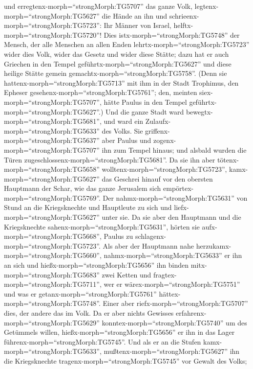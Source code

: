 und erregtenx-morph=``strongMorph:TG5707'' das ganze Volk,
legtenx-morph=``strongMorph:TG5627'' die Hände an ihn und
schrieenx-morph=``strongMorph:TG5723'':  Ihr Männer von
Israel, helftx-morph=``strongMorph:TG5720''! Dies
istx-morph=``strongMorph:TG5748'' der Mensch, der alle Menschen an allen
Enden lehrtx-morph=``strongMorph:TG5723'' wider dies Volk, wider das
Gesetz und wider diese Stätte; dazu hat er auch Griechen in den Tempel
geführtx-morph=``strongMorph:TG5627'' und diese heilige Stätte gemein
gemachtx-morph=``strongMorph:TG5758''.  (Denn sie
hattenx-morph=``strongMorph:TG5713'' mit ihm in der Stadt Trophimus, den
Epheser gesehenx-morph=``strongMorph:TG5761''; den, meinten
siex-morph=``strongMorph:TG5707'', hätte Paulus in den Tempel
geführtx-morph=``strongMorph:TG5627''.)  Und die ganze
Stadt ward bewegtx-morph=``strongMorph:TG5681'', und ward ein
Zulaufx-morph=``strongMorph:TG5633'' des Volks. Sie
griffenx-morph=``strongMorph:TG5637'' aber Paulus und
zogenx-morph=``strongMorph:TG5707'' ihn zum Tempel hinaus; und alsbald
wurden die Türen zugeschlossenx-morph=``strongMorph:TG5681''.
 Da sie ihn aber tötenx-morph=``strongMorph:TG5658''
wolltenx-morph=``strongMorph:TG5723'', kamx-morph=``strongMorph:TG5627''
das Geschrei hinauf vor den obersten Hauptmann der Schar, wie das ganze
Jerusalem sich empörtex-morph=``strongMorph:TG5769''.  Der
nahmx-morph=``strongMorph:TG5631'' von Stund an die Kriegsknechte und
Hauptleute zu sich und liefx-morph=``strongMorph:TG5627'' unter sie. Da
sie aber den Hauptmann und die Kriegsknechte
sahenx-morph=``strongMorph:TG5631'', hörten sie
aufx-morph=``strongMorph:TG5668'', Paulus zu
schlagenx-morph=``strongMorph:TG5723''.  Als aber der
Hauptmann nahe herzukamx-morph=``strongMorph:TG5660'',
nahmx-morph=``strongMorph:TG5633'' er ihn an sich und
hießx-morph=``strongMorph:TG5656'' ihn binden
mitx-morph=``strongMorph:TG5683'' zwei Ketten und
fragtex-morph=``strongMorph:TG5711'', wer er
wärex-morph=``strongMorph:TG5751'' und was er
getanx-morph=``strongMorph:TG5761'' hättex-morph=``strongMorph:TG5748''.
 Einer aber riefx-morph=``strongMorph:TG5707'' dies, der
andere das im Volk. Da er aber nichts Gewisses
erfahrenx-morph=``strongMorph:TG5629''
konntex-morph=``strongMorph:TG5740'' um des Getümmels willen,
hießx-morph=``strongMorph:TG5656'' er ihn in das Lager
führenx-morph=``strongMorph:TG5745''.  Und als er an die
Stufen kamx-morph=``strongMorph:TG5633'',
mußtenx-morph=``strongMorph:TG5627'' ihn die Kriegsknechte
tragenx-morph=``strongMorph:TG5745'' vor Gewalt des Volks; 
